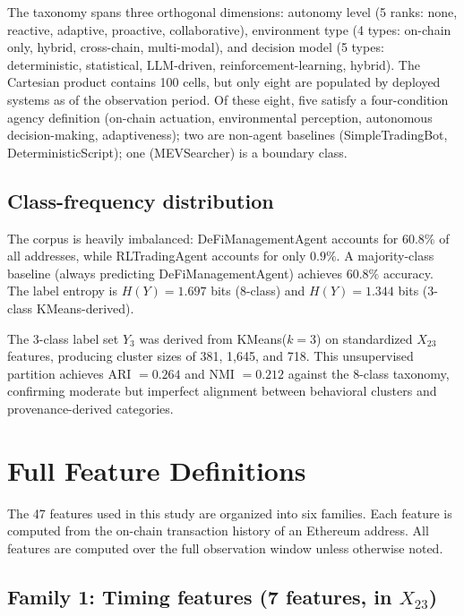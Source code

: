 \documentclass[11pt,a4paper]{article}
\renewcommand{\_}{\oldunderscore\allowbreak}
\begin{document}
The taxonomy spans three orthogonal dimensions: autonomy level
(5 ranks: none, reactive, adaptive, proactive, collaborative),
environment type (4 types: on-chain only, hybrid, cross-chain,
multi-modal), and decision model (5 types: deterministic, statistical,
LLM-driven, reinforcement-learning, hybrid). The Cartesian product
contains 100 cells, but only eight are populated by deployed systems
as of the observation period. Of these eight, five satisfy a
four-condition agency definition (on-chain actuation, environmental
perception, autonomous decision-making, adaptiveness); two are
non-agent baselines (SimpleTradingBot, DeterministicScript); one
(MEVSearcher) is a boundary class.

\subsection{Class-frequency distribution}

The corpus is heavily imbalanced: DeFiManagementAgent accounts for
$60.8\%$ of all addresses, while RLTradingAgent accounts for only
$0.9\%$. A majority-class baseline (always predicting
DeFiManagementAgent) achieves $60.8\%$ accuracy. The label entropy
is $H(Y) = 1.697$ bits (8-class) and $H(Y) = 1.344$ bits (3-class
KMeans-derived).

The 3-class label set $Y_3$ was derived from KMeans($k{=}3$) on
standardized $X_{23}$ features, producing cluster sizes of 381, 1{,}645,
and 718. This unsupervised partition achieves ARI $= 0.264$ and
NMI $= 0.212$ against the 8-class taxonomy, confirming moderate
but imperfect alignment between behavioral clusters and
provenance-derived categories.

\section{Full Feature Definitions}
\label{sec:note2}

The 47 features used in this study are organized into six families.
Each feature is computed from the on-chain transaction history of an
Ethereum address. All features are computed over the full observation
window unless otherwise noted.

\subsection{Family 1: Timing features (7 features, in $X_{23}$)}
\end{document}
